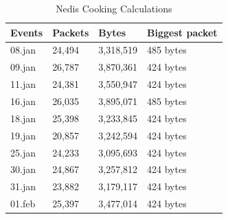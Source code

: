 \begin{table}[H]
\centering
\caption{Nedis Cooking Calculations}
\label{tab:NedisCookingCalculations}
    \begin{tabular}{|l|l|l|l|}
        \hline
        \textbf{Events}    & \textbf{Packets} & \textbf{Bytes}     & \textbf{Biggest packet} \\ \hline
        08.jan             & 24,494           & 3,318,519          & 485 bytes               \\ \hline
        09.jan             & 26,787           & 3,870,361          & 424 bytes               \\ \hline
        11.jan             & 24,381           & 3,550,947          & 424 bytes               \\ \hline
        16.jan             & 26,035           & 3,895,071          & 485 bytes               \\ \hline
        18.jan             & 25,398           & 3,233,845          & 424 bytes               \\ \hline
        19.jan             & 20,857           & 3,242,594          & 424 bytes               \\ \hline
        25.jan             & 24,233           & 3,095,693          & 424 bytes               \\ \hline
        30.jan             & 24,867           & 3,257,812          & 424 bytes               \\ \hline
        31.jan             & 23,882           & 3,179,117          & 424 bytes               \\ \hline
        01.feb             & 25,397           & 3,477,014          & 424 bytes               \\ \hline
    \end{tabular}
\end{table}

